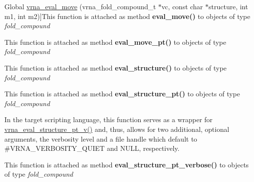 \begin{DoxyRefList}
%
Global \hyperlink{group__eval_gaff1b9e4f4d17b434b0a822fe783672c1}{vrna\+\_\+eval\+\_\+move} (vrna\+\_\+fold\+\_\+compound\+\_\+t $\ast$vc, const char $\ast$structure, int m1, int m2)]This function is attached as method {\bfseries eval\+\_\+move()} to objects of type {\itshape fold\+\_\+compound}  
\item[\label{wrappers__wrappers000032}%
\Hypertarget{wrappers__wrappers000032}%
Global \hyperlink{group__eval_ga123dabc119ea98c968a5e903cc46f0fb}{vrna\+\_\+eval\+\_\+move\+\_\+pt} (vrna\+\_\+fold\+\_\+compound\+\_\+t $\ast$vc, short $\ast$pt, int m1, int m2)]This function is attached as method {\bfseries eval\+\_\+move\+\_\+pt()} to objects of type {\itshape fold\+\_\+compound}  
\item[\label{wrappers__wrappers000025}%
\Hypertarget{wrappers__wrappers000025}%
Global \hyperlink{group__eval_ga58f199f1438d794a265f3b27fc8ea631}{vrna\+\_\+eval\+\_\+structure} (vrna\+\_\+fold\+\_\+compound\+\_\+t $\ast$vc, const char $\ast$structure)]This function is attached as method {\bfseries eval\+\_\+structure()} to objects of type {\itshape fold\+\_\+compound}  
\item[\label{wrappers__wrappers000026}%
\Hypertarget{wrappers__wrappers000026}%
Global \hyperlink{group__eval_gadbd09372ddfd7a450bbd590c96a6bfe4}{vrna\+\_\+eval\+\_\+structure\+\_\+pt} (vrna\+\_\+fold\+\_\+compound\+\_\+t $\ast$vc, const short $\ast$pt)]This function is attached as method {\bfseries eval\+\_\+structure\+\_\+pt()} to objects of type {\itshape fold\+\_\+compound}  
\item[\label{wrappers__wrappers000053}%
\Hypertarget{wrappers__wrappers000053}%
Global \hyperlink{group__eval_ga0bba59b4d6e53461088666ff4aece7b0}{vrna\+\_\+eval\+\_\+structure\+\_\+pt\+\_\+simple} (const char $\ast$string, const short $\ast$pt)]In the target scripting language, this function serves as a wrapper for \hyperlink{group__eval_ga2c6533ba0afe4c88d335d8f1e0e2a48e}{vrna\+\_\+eval\+\_\+structure\+\_\+pt\+\_\+v()} and, thus, allows for two additional, optional arguments, the verbosity level and a file handle which default to \#\+V\+R\+N\+A\+\_\+\+V\+E\+R\+B\+O\+S\+I\+T\+Y\+\_\+\+Q\+U\+I\+ET and N\+U\+LL, respectively.  
\item[\label{wrappers__wrappers000028}%
\Hypertarget{wrappers__wrappers000028}%
Global \hyperlink{group__eval_ga8a517cfeeae8c376ae7b1e0c401d38b4}{vrna\+\_\+eval\+\_\+structure\+\_\+pt\+\_\+verbose} (vrna\+\_\+fold\+\_\+compound\+\_\+t $\ast$vc, const short $\ast$pt, F\+I\+LE $\ast$file)]This function is attached as method {\bfseries eval\+\_\+structure\+\_\+pt\+\_\+verbose()} to objects of type {\itshape fold\+\_\+compound}  

\end{DoxyRefList}
